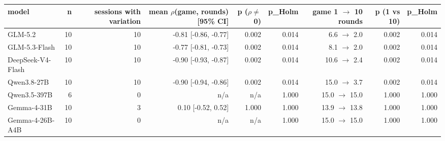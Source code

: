 \begin{tabular}{lrrrrrrrr}
\toprule
\textbf{model} & \textbf{n} & \textbf{sessions with variation} & \textbf{mean $\rho$(game, rounds) [95\% CI]} & \textbf{p ($\rho$$\neq$0)} & \textbf{p\_Holm} & \textbf{game 1 $\to$ 10 rounds} & \textbf{p (1 vs 10)} & \textbf{p\_Holm} \\
\midrule
GLM-5.2 & 10 & 10 & -0.81 [-0.86, -0.77] & 0.002 & 0.014 & 6.6 $\to$ 2.0 & 0.002 & 0.014 \\
GLM-5.3-Flash & 10 & 10 & -0.77 [-0.81, -0.73] & 0.002 & 0.014 & 8.1 $\to$ 2.0 & 0.002 & 0.014 \\
DeepSeek-V4-Flash & 10 & 10 & -0.90 [-0.93, -0.87] & 0.002 & 0.014 & 10.6 $\to$ 2.4 & 0.002 & 0.014 \\
Qwen3.8-27B & 10 & 10 & -0.90 [-0.94, -0.86] & 0.002 & 0.014 & 15.0 $\to$ 3.7 & 0.002 & 0.014 \\
Qwen3.5-397B & 6 & 0 & n/a & n/a & 1.000 & 15.0 $\to$ 15.0 & 1.000 & 1.000 \\
Gemma-4-31B & 10 & 3 & 0.10 [-0.52, 0.52] & 1.000 & 1.000 & 13.9 $\to$ 13.8 & 1.000 & 1.000 \\
Gemma-4-26B-A4B & 10 & 0 & n/a & n/a & 1.000 & 15.0 $\to$ 15.0 & 1.000 & 1.000 \\
\bottomrule
\end{tabular}
